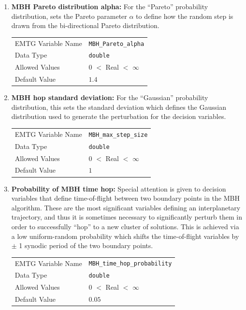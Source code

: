 \begin{enumerate}
    \item \textbf{\ac{MBH} Pareto distribution alpha:} For the ``Pareto'' probability distribution, sets the Pareto parameter $\alpha$ to define how the random step is drawn from the bi-directional Pareto distribution.
    \begin{table}[H]
        \hspace{2cm}
        \begin{tabular}{lp{5cm}}
        \ac{EMTG} Variable Name & \verb|MBH_Pareto_alpha| \\
        Data Type & \verb|double| \\
        Allowed Values & $0$ $<$ Real $<$ $\infty$ \\
        Default Value & $1.4$ \\
        \end{tabular}
    \end{table}
    
    \item \textbf{\ac{MBH} hop standard deviation:} For the ``Gaussian'' probability distribution, this sets the standard deviation which defines the Gaussian distribution used to generate the perturbation for the decision variables.
    \begin{table}[H]
        \hspace{2cm}
        \begin{tabular}{lp{5cm}}
        \ac{EMTG} Variable Name & \verb|MBH_max_step_size| \\
        Data Type & \verb|double| \\
        Allowed Values & $0$ $<$ Real $<$ $\infty$ \\
        Default Value & $1$ \\
        \end{tabular}
    \end{table}
    
    \item \textbf{Probability of \ac{MBH} time hop:} Special attention is given to decision variables that define time-of-flight between two boundary points in the \ac{MBH} algorithm. These are the most significant variables defining an interplanetary trajectory, and thus it is sometimes necessary to significantly perturb them in order to successfully ``hop'' to a new cluster of solutions. This is achieved via a low uniform-random probability which shifts the time-of-flight variables by $\pm$ 1 synodic period of the two boundary points.
    \begin{table}[H]
        \hspace{2cm}
        \begin{tabular}{lp{5cm}}
        \ac{EMTG} Variable Name & \verb|MBH_time_hop_probability| \\
        Data Type & \verb|double| \\
        Allowed Values & $0$ $<$ Real $<$ $\infty$ \\
        Default Value & $0.05$ \\
        \end{tabular}
    \end{table}
    

\end{enumerate}
